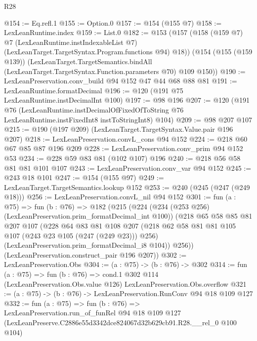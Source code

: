 \begin{lexlean}{R28}
\begin{coremodule}
@154 := Eq.refl.{1}
@155 := Option.{0}
@157 := @154 (@155 @7)
@158 := LexLeanRuntime.index
@159 := List.{0}
@182 := @153
    (@157
      (@158
        (@159 @7)
        @7
        (LexLeanRuntime.instIndexableList @7)
        (LexLeanTarget.TargetSyntax.Program.functions @94)
        @18))
    (@154
      (@155 (@159 @139))
      (LexLeanTarget.TargetSemantics.bindAll
        (LexLeanTarget.TargetSyntax.Function.parameters @70)
        @109
        @150))
@190 := LexLeanPreservation.conv_build @94 @152 @47 @44 @68 @88 @81
@191 := LexLeanRuntime.formatDecimal
@196 := @120 (@191 @75 LexLeanRuntime.instDecimalInt @100)
@197 := @98 @196
@207 := @120
    (@191
      @76
      (LexLeanRuntime.instDecimalOfFixedOfToString
        @76
        LexLeanRuntime.instFixedInt8
        instToStringInt8)
      @104)
@209 := @98 @207 @107
@215 := @190 (@197 @209) (LexLeanTarget.TargetSyntax.Value.pair @196 @207)
@218 := LexLeanPreservation.convL_cons @94 @152
@224 := @218 @60 @67 @85 @87 @196 @209
@228 := LexLeanPreservation.conv_prim @94 @152 @53
@234 := @228 @59 @83 @81 (@102 @107) @196
@240 := @218 @56 @58 @81 @81 @101 @107
@243 := LexLeanPreservation.conv_var @94 @152
@245 := @243 @18 @101
@247 := @154 (@155 @97)
@249 := LexLeanTarget.TargetSemantics.lookup @152
@253 := @240 (@245 (@247 (@249 @18)))
@256 := LexLeanPreservation.convL_nil @94 @152
@301 := fun (a : @75) =>
  fun (b : @76) =>
  @182
    (@215
      (@224
        (@234 (@253 @256) (LexLeanPreservation.prim_formatDecimal_int @100))
        (@218
          @65
          @58
          @85
          @81
          @207
          @107
          (@228
            @64
            @83
            @81
            @108
            @207
            (@218 @62 @58 @81 @81 @105 @107 (@243 @23 @105 (@247 (@249 @23))) @256)
            (LexLeanPreservation.prim_formatDecimal_i8 @104))
          @256))
      (LexLeanPreservation.construct_pair @196 @207))
@302 := LexLeanPreservation.Obs
@304 := (a : @75) -> (b : @76) -> @302
@314 := fun (a : @75) =>
  fun (b : @76) =>
  cond.{1} @302 @114 (LexLeanPreservation.Obs.value @126) LexLeanPreservation.Obs.overflow
@321 := (a : @75) -> (b : @76) -> LexLeanPreservation.RunConv @94 @18 @109 @127
@332 := fun (a : @75) =>
  fun (b : @76) =>
  LexLeanPreservation.run_of_funRel
    @94
    @18
    @109
    @127
    (LexLeanPreserve.C2886e55d3342dce824067d32b629cb91.R28.__rel_0 @100 @104)
\end{coremodule}
\end{lexlean}
